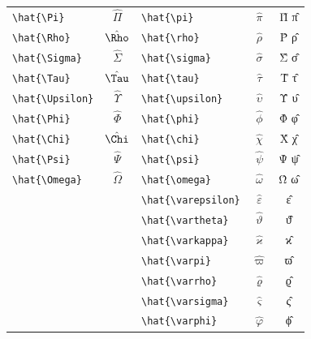 \documentclass[12pt,a4paper]{article}
\begin{document}
\begin{longtable}{|l|c|l|c|c|}
\verb|\hat{\Pi}|         & $\hat{\Pi}$      & \verb|\hat{\pi}|         & $\hat{\pi}$         & Π̂ π̂ \\
\verb|\hat{\Rho}|        & $\hat{\Rho}$     & \verb|\hat{\rho}|        & $\hat{\rho}$        & Ρ̂ ρ̂ \\
\verb|\hat{\Sigma}|      & $\hat{\Sigma}$   & \verb|\hat{\sigma}|      & $\hat{\sigma}$      & Σ̂ σ̂ \\
\verb|\hat{\Tau}|        & $\hat{\Tau}$     & \verb|\hat{\tau}|        & $\hat{\tau}$        & Τ̂ τ̂ \\
\verb|\hat{\Upsilon}|    & $\hat{\Upsilon}$ & \verb|\hat{\upsilon}|    & $\hat{\upsilon}$    & Υ̂ υ̂ \\
\verb|\hat{\Phi}|        & $\hat{\Phi}$     & \verb|\hat{\phi}|        & $\hat{\phi}$        & Φ̂ φ̂ \\
\verb|\hat{\Chi}|        & $\hat{\Chi}$     & \verb|\hat{\chi}|        & $\hat{\chi}$        & Χ̂ χ̂ \\
\verb|\hat{\Psi}|        & $\hat{\Psi}$     & \verb|\hat{\psi}|        & $\hat{\psi}$        & Ψ̂ ψ̂ \\
\verb|\hat{\Omega}|      & $\hat{\Omega}$   & \verb|\hat{\omega}|      & $\hat{\omega}$      & Ω̂ ω̂ \\
                         &                  & \verb|\hat{\varepsilon}| & $\hat{\varepsilon}$ & ε̂ \\
                         &                  & \verb|\hat{\vartheta}|   & $\hat{\vartheta}$   & ϑ̂ \\
                         &                  & \verb|\hat{\varkappa}|   & $\hat{\varkappa}$   & ϰ̂ \\
                         &                  & \verb|\hat{\varpi}|      & $\hat{\varpi}$      & ϖ̂ \\
                         &                  & \verb|\hat{\varrho}|     & $\hat{\varrho}$     & ϱ̂ \\
                         &                  & \verb|\hat{\varsigma}|   & $\hat{\varsigma}$   & ς̂ \\
                         &                  & \verb|\hat{\varphi}|     & $\hat{\varphi}$     & ϕ̂ \\
\hline
\end{longtable}
\end{document}
